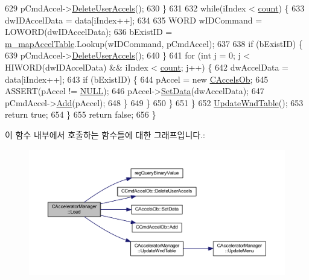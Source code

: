\begin{DoxyCode}
629         pCmdAccel->\mbox{\hyperlink{class_c_cmd_accel_ob_a7040471adc76f057a1d79c9fdfb84fe8}{DeleteUserAccels}}();
630       \}
631       
632       \textcolor{keywordflow}{while}(iIndex < \mbox{\hyperlink{expr_8cpp_a16ff2d8e15ade4948398b0aeb80124a8}{count}}) \{
633         dwIDAccelData = data[iIndex++];
634         
635         WORD wIDCommand = LOWORD(dwIDAccelData);
636         bExistID = \mbox{\hyperlink{class_c_accelerator_manager_a16b8d3e9328bc0eeeb048630deff2768}{m\_mapAccelTable}}.Lookup(wIDCommand, pCmdAccel);
637 
638         \textcolor{keywordflow}{if} (bExistID) \{
639           pCmdAccel->\mbox{\hyperlink{class_c_cmd_accel_ob_a7040471adc76f057a1d79c9fdfb84fe8}{DeleteUserAccels}}();
640         \}
641         \textcolor{keywordflow}{for} (\textcolor{keywordtype}{int} j = 0; j < HIWORD(dwIDAccelData) && iIndex < \mbox{\hyperlink{expr_8cpp_a16ff2d8e15ade4948398b0aeb80124a8}{count}}; j++) \{
642           dwAccelData = data[iIndex++];
643           \textcolor{keywordflow}{if} (bExistID) \{
644             pAccel = \textcolor{keyword}{new} \mbox{\hyperlink{class_c_accels_ob}{CAccelsOb}};
645             ASSERT(pAccel != \mbox{\hyperlink{getopt1_8c_a070d2ce7b6bb7e5c05602aa8c308d0c4}{NULL}});
646             pAccel->\mbox{\hyperlink{class_c_accels_ob_a47a1e7e047807b7a36553aa351768096}{SetData}}(dwAccelData);
647             pCmdAccel->\mbox{\hyperlink{class_c_cmd_accel_ob_a519f8c7ac935b0d06531589e5427b656}{Add}}(pAccel);
648           \}
649         \}
650       \}
651     \}
652     \mbox{\hyperlink{class_c_accelerator_manager_a3fa9c8e4f44acc76cc40fc7382e597d8}{UpdateWndTable}}();
653     \textcolor{keywordflow}{return} \textcolor{keyword}{true};
654   \}
655   \textcolor{keywordflow}{return} \textcolor{keyword}{false};
656 \}
\end{DoxyCode}
이 함수 내부에서 호출하는 함수들에 대한 그래프입니다.\+:
\nopagebreak
\begin{figure}[H]
\begin{center}
\leavevmode
\includegraphics[width=350pt]{class_c_accelerator_manager_a8e87ae6f5464a4fa052c91c0ee361b6d_cgraph}
\end{center}
\end{figure}
